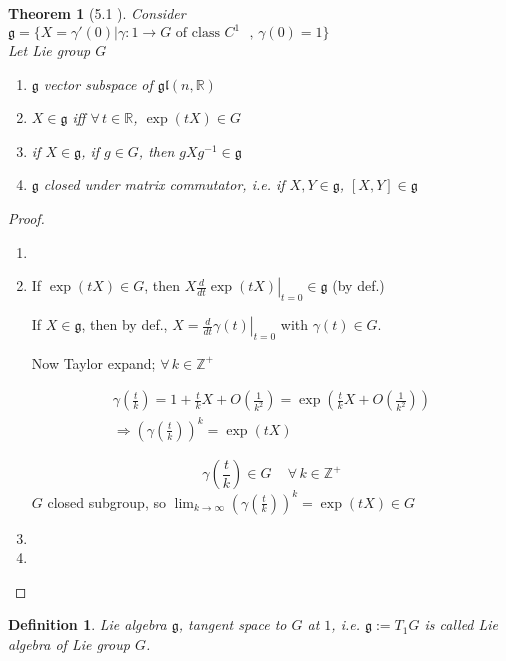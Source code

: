 \documentclass[10pt]{amsart}
\newtheorem{theorem}{Theorem}
\newtheorem{definition}{Definition}
\begin{document}
\begin{multicols*}{2}
\begin{theorem}[5.1 \cite{YKosmann-Schwarzbach2010}]\label{Thm:5.1YKos}
  Consider $\mathfrak{g} = \lbrace X = \gamma'(0) | \gamma : 1 \to G \text{ of class $C^1$ }, \, \gamma(0) = 1 \rbrace$ \\
Let Lie group $G$
\begin{enumerate}
  \item[(i)] $\mathfrak{g}$ vector subspace of $\mathfrak{gl}(n,\mathbb{R})$
  \item[(ii)] $X \in \mathfrak{g}$ iff $\forall \, t \in \mathbb{R}$, $\exp{(tX)} \in G$ 
  \item[(iii)] if $X \in \mathfrak{g}$, if $g\in G$, then $gXg^{-1} \in \mathfrak{g}$
  \item[(iv)] $\mathfrak{g}$ closed under matrix commutator, i.e. if $X,Y \in \mathfrak{g}$, $[X,Y] \in \mathfrak{g}$
\end{enumerate}
\end{theorem}

\begin{proof}
\begin{enumerate}
  \item[(i)]
\item[(ii)] If $\exp{ (tX)} \in G$, then $X \left. \frac{d}{dt} \exp{(tX)} \right|_{t=0} \in \mathfrak{g}$ (by def.)

If $X \in \mathfrak{g}$, then by def., $X = \left. \frac{d}{dt} \gamma(t) \right|_{t=0}$ with $\gamma(t) \in G$.  

Now Taylor expand; $\forall \, k \in \mathbb{Z}^+$ 

\[
\begin{gathered}
  \gamma\left( \frac{t}{k} \right) = 1 + \frac{t}{k} X + O\left( \frac{1}{k^2} \right) = \exp{ \left( \frac{t}{k} X + O\left( \frac{1}{k^2} \right) \right) } \\
  \Longrightarrow \left( \gamma \left( \frac{t}{k} \right) \right)^k = \exp{ (tX)}
\end{gathered}
\]

\[
\gamma\left( \frac{t}{k} \right) \in G \quad \, \forall \, k \in \mathbb{Z}^+
\]
$G$ closed subgroup, so $\lim_{k \to \infty} (\gamma\left( \frac{t}{k} \right) )^k = \exp{(tX) } \in G$
\item[(iii)]
\item[(iv)]
\end{enumerate}
\end{proof}

\begin{definition}
  Lie algebra $\mathfrak{g}$, tangent space to $G$ at $1$, i.e. $\mathfrak{g} := T_1 G$ is called \emph{Lie algebra} of Lie group $G$.  


\end{definition}
\end{multicols*}
\end{document}
